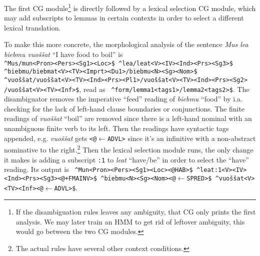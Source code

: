 \documentclass{book}
\begin{document}
The first CG module\footnote{If the disambiguation rules leaves any
  ambiguity, that CG only prints the first analysis. We may later
  train an HMM to get rid of leftover ambiguity, this would go between
  the two CG modules.} is directly followed by a lexical selection CG
module, which may add subscripts to lemmas in certain contexts in
order to select a different lexical translation.

To make this more concrete, the morphological analysis of the
sentence \textit{Mus lea biebmu vuoššat} ``I have food to boil'' is\\
\texttt{\small \^{}Mus/mun<Pron><Pers><Sg1><Loc>\${}
  \^{}lea/leat<V><IV><Ind><Prs><Sg3>\${}
  \^{}biebmu/biebmat<V><TV><Imprt><Du1>/biebmu<N><Sg><Nom>\${}\\
  \^{}vuoššat/vuoššat<V><TV><Ind><Prs><Pl1>/vuoššat<V><TV><Ind><Prs><Sg2>
  /vuoššat<V><TV><Inf>\${}}, read as \texttt{\small
  \^{}form/lemma1<tags1>/lemma2<tags2>\${}}. The disambiguator removes
the imperative ``feed'' reading of \textit{biebmu} ``food'' by i.a.
checking for the lack of left-hand clause boundaries or conjunctions.
The finite readings of \textit{vuoššat} ``boil'' are removed since
there is a left-hand nominal with an unambiguous finite verb to its
left. Then the readings have syntactic tags appended, e.g.
\textit{vuoššat} gets \texttt{<@$\leftarrow$ADVL>} since it's an
infinitive with a non-abstract nominative to the right.\footnote{The
  actual rules have several other context conditions.} Then the
lexical selection module runs, the only change it makes is adding a
subscript \texttt{:1} to \textit{leat} ``have/be'' in order to select
the ``have'' reading. Its output is \texttt{\small
  \^{}Mun<Pron><Pers><Sg1><Loc><@HAB>\${}
  \^{}leat:1<V><IV><Ind><Prs><Sg3><@+FMAINV>\${}
  \^{}biebmu<N><Sg><Nom><@$\leftarrow{}$SPRED>\${}
  \^{}vuoššat<V><TV><Inf><@$\leftarrow{}$ADVL>\${}}.

\end{document}

